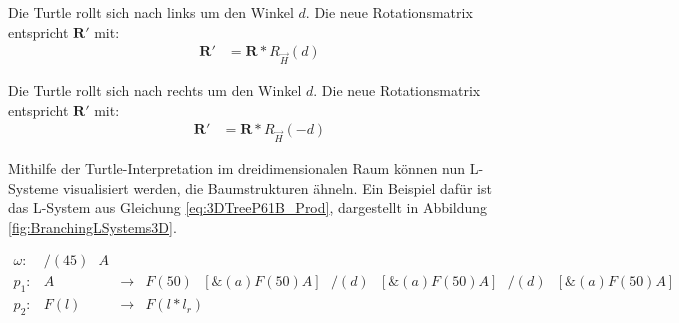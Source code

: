 \begin{description}[labelindent]
	\item[\boldmath$\backslash(d)$]  Die Turtle rollt sich nach links um den Winkel $d$. Die neue Rotationsmatrix entspricht $\boldsymbol{R'}$ mit:\\
	\begin{equation}
	\begin{array}{ll}
	\boldsymbol{R'} & =  \boldsymbol{R} * R_{\overrightarrow{H}}(d)
	\end{array}
	\end{equation}
	
	\item[\boldmath$/(d)$]  Die Turtle rollt sich nach rechts um den Winkel $d$. Die neue Rotationsmatrix entspricht $\boldsymbol{R'}$ mit:\\
	\begin{equation}
	\begin{array}{ll}
	\boldsymbol{R'} & =  \boldsymbol{R} * R_{\overrightarrow{H}}(-d)
	\end{array}
	\end{equation}
\end{description}
\cite[S.19]{ABOP:04} \cite[S.69]{Deussen:05}

Mithilfe der Turtle-Interpretation im dreidimensionalen Raum können nun L-Systeme visualisiert werden, die Baumstrukturen ähneln. Ein Beispiel dafür ist das L-System aus Gleichung \ref{eq:3DTreeP61B_Prod}, dargestellt in Abbildung \ref{fig:BranchingLSystems3D}.

\begin{equation}
	\begin{array}{llll}
	\omega :&  /(45)\text{ }A \\
	p_1 :&  A &\rightarrow & F(50)\text{ }[\&(a)F(50)A]\text{ }/(d)\text{ }[\&(a)F(50)A]\text{ }/(d)\text{ }[\&(a)F(50)A] \\
	p_2 :& F(l) &\rightarrow & F(l*l_r)
	\end{array}
	\label{eq:3DTreeP61B_Prod}
\end{equation}

